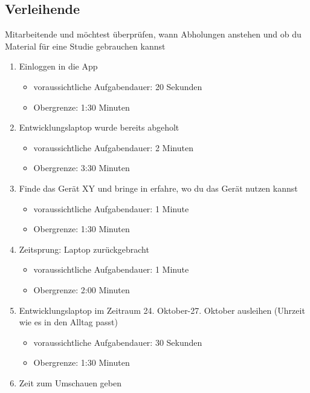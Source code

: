 \subsection{Verleihende}
{\sffamily\color{maincolor}{Szenario:}} Mitarbeitende und möchtest überprüfen, wann Abholungen anstehen und ob du Material für eine Studie gebrauchen kannst
\begin{enumerate}
    \item Einloggen in die App
            \begin{itemize}
                \item voraussichtliche Aufgabendauer: 20 Sekunden
                \item Obergrenze: 1:30 Minuten
            \end{itemize}
    \item Entwicklungslaptop wurde bereits abgeholt
            \begin{itemize}
                \item voraussichtliche Aufgabendauer: 2 Minuten
                \item Obergrenze: 3:30 Minuten
            \end{itemize}
    \item Finde das Gerät XY und bringe in erfahre, wo du das Gerät nutzen kannst
            \begin{itemize}
                \item voraussichtliche Aufgabendauer: 1 Minute
                \item Obergrenze: 1:30 Minuten
            \end{itemize}
    \item Zeitsprung: Laptop zurückgebracht
            \begin{itemize}
                \item voraussichtliche Aufgabendauer: 1 Minute
                \item Obergrenze: 2:00 Minuten
            \end{itemize}
    \item Entwicklungslaptop im Zeitraum 24. Oktober-27. Oktober ausleihen (Uhrzeit wie es in den Alltag passt)
            \begin{itemize}
                \item voraussichtliche Aufgabendauer: 30 Sekunden
                \item Obergrenze: 1:30 Minuten
            \end{itemize}
    \item Zeit zum Umschauen geben
\end{enumerate}

